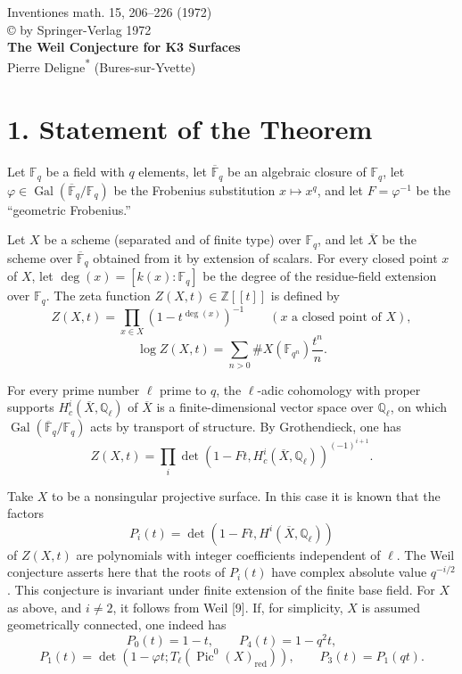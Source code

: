 \documentclass[10pt,leqno]{article}
\newcommand{\F}{\mathbb{F}}
\newcommand{\Z}{\mathbb{Z}}
\newcommand{\Ql}{\mathbb{Q}_\ell}
\newcommand{\Fp}{\mathbb{F}_q}
\newcommand{\Gal}{\operatorname{Gal}}
\newcommand{\Pic}{\operatorname{Pic}}
\begin{document}
\begin{center}
{\large Inventiones math. 15, 206--226 (1972)}\\
{\small \copyright{} by Springer-Verlag 1972}\\[3.0em]
{\Large\bfseries The Weil Conjecture for K3 Surfaces}\\[1.5em]
{Pierre Deligne\textsuperscript{*} (Bures-sur-Yvette)}
\end{center}

\section*{1. Statement of the Theorem}

Let $\Fp$ be a field with $q$ elements, let $\overline{\F}_q$ be an algebraic closure of $\Fp$, let $\varphi\in\Gal(\overline{\F}_q/\Fp)$ be the Frobenius substitution $x\mapsto x^q$, and let $F=\varphi^{-1}$ be the ``geometric Frobenius.''

Let $X$ be a scheme (separated and of finite type) over $\Fp$, and let $\overline X$ be the scheme over $\overline{\F}_q$ obtained from it by extension of scalars. For every closed point $x$ of $X$, let $\deg(x)=[k(x):\Fp]$ be the degree of the residue-field extension over $\Fp$. The zeta function $Z(X,t)\in\Z[[t]]$ is defined by
\[
Z(X,t)=\prod_{x\in X}(1-t^{\deg(x)})^{-1}\qquad(x\text{ a closed point of }X),
\]
\[
\log Z(X,t)=\sum_{n>0}\#X(\F_{q^n})\frac{t^n}{n}.
\]

For every prime number $\ell$ prime to $q$, the $\ell$-adic cohomology with proper supports $H_c^i(\overline X,\Ql)$ of $\overline X$ is a finite-dimensional vector space over $\Ql$, on which $\Gal(\overline{\F}_q/\Fp)$ acts by transport of structure. By Grothendieck, one has
\[
Z(X,t)=\prod_i\det(1-Ft,H_c^i(\overline X,\Ql))^{(-1)^{i+1}}.
\]

Take $X$ to be a nonsingular projective surface. In this case it is known that the factors
\[
P_i(t)=\det(1-Ft,H^i(\overline X,\Ql))
\]
of $Z(X,t)$ are polynomials with integer coefficients independent of $\ell$. The Weil conjecture asserts here that the roots of $P_i(t)$ have complex absolute value $q^{-i/2}$. This conjecture is invariant under finite extension of the finite base field. For $X$ as above, and $i\ne2$, it follows from Weil [9]. If, for simplicity, $X$ is assumed geometrically connected, one indeed has
\[
P_0(t)=1-t,
\qquad
P_4(t)=1-q^2t,
\]
\[
P_1(t)=\det(1-\varphi t;T_\ell(\Pic^0(X)_{\mathrm{red}})),
\qquad
P_3(t)=P_1(qt).
\]
\end{document}
